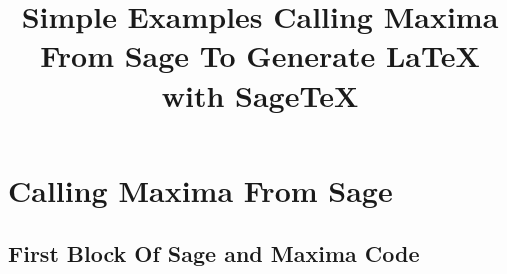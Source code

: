 \documentclass{article}
\begin{document}

\newpage

\tableofcontents
\newpage

\title{Simple Examples Calling Maxima From Sage To Generate \LaTeX{} with \textsf{Sage\TeX}}

\section{Calling Maxima From Sage}

\subsection{First Block Of Sage and Maxima Code}
\end{document}
